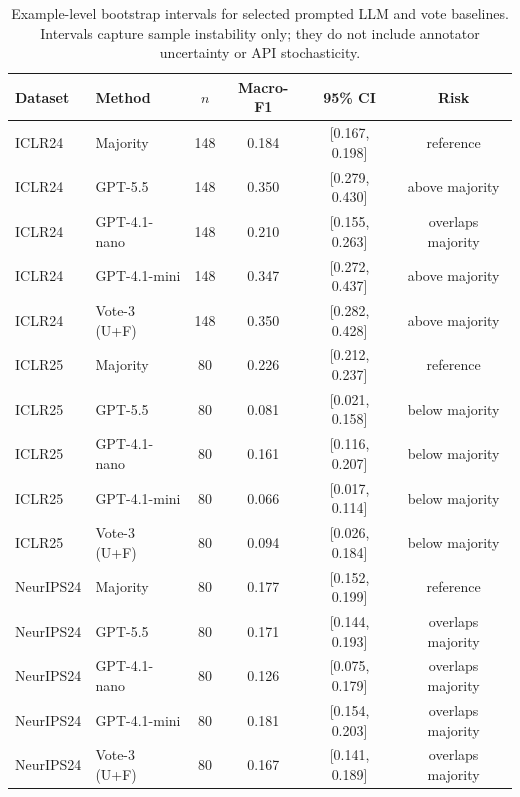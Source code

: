 \begin{table}[t]
\centering
\scriptsize
\setlength{\tabcolsep}{4pt}
\begin{tabular}{llcccc}
\toprule
Dataset & Method & $n$ & Macro-F1 & 95\% CI & Risk \\
\midrule
ICLR24 & Majority & 148 & 0.184 & [0.167, 0.198] & reference \\
ICLR24 & GPT-5.5 & 148 & 0.350 & [0.279, 0.430] & above majority \\
ICLR24 & GPT-4.1-nano & 148 & 0.210 & [0.155, 0.263] & overlaps majority \\
ICLR24 & GPT-4.1-mini & 148 & 0.347 & [0.272, 0.437] & above majority \\
ICLR24 & Vote-3 (U+F) & 148 & 0.350 & [0.282, 0.428] & above majority \\
ICLR25 & Majority & 80 & 0.226 & [0.212, 0.237] & reference \\
ICLR25 & GPT-5.5 & 80 & 0.081 & [0.021, 0.158] & below majority \\
ICLR25 & GPT-4.1-nano & 80 & 0.161 & [0.116, 0.207] & below majority \\
ICLR25 & GPT-4.1-mini & 80 & 0.066 & [0.017, 0.114] & below majority \\
ICLR25 & Vote-3 (U+F) & 80 & 0.094 & [0.026, 0.184] & below majority \\
NeurIPS24 & Majority & 80 & 0.177 & [0.152, 0.199] & reference \\
NeurIPS24 & GPT-5.5 & 80 & 0.171 & [0.144, 0.193] & overlaps majority \\
NeurIPS24 & GPT-4.1-nano & 80 & 0.126 & [0.075, 0.179] & overlaps majority \\
NeurIPS24 & GPT-4.1-mini & 80 & 0.181 & [0.154, 0.203] & overlaps majority \\
NeurIPS24 & Vote-3 (U+F) & 80 & 0.167 & [0.141, 0.189] & overlaps majority \\
\bottomrule
\end{tabular}
\caption{Example-level bootstrap intervals for selected prompted LLM and vote baselines. Intervals capture sample instability only; they do not include annotator uncertainty or API stochasticity.}
\label{tab:prompted-llm-bootstrap}
\end{table}

